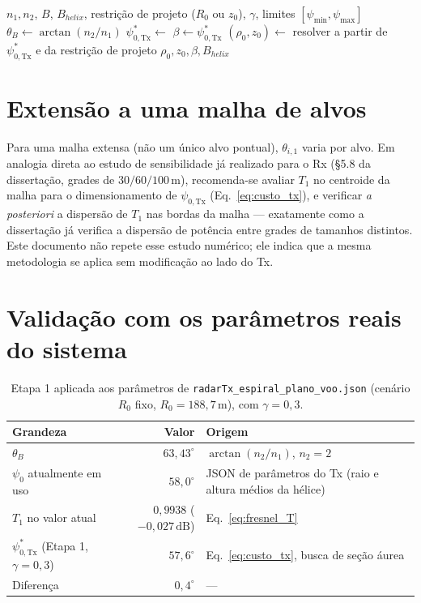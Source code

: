 \documentclass[12pt,a4paper,oneside]{book}
\theoremstyle{definition}
\theoremstyle{remark}
\newcommand{\thetaB}{\theta_B}
\newcommand{\psiT}{\psi_{0,\mathrm{Tx}}}
\begin{document}
\begin{algorithm}[H]
\caption{Otimização do Tx (Etapa 1)}
\begin{algorithmic}[1]
\Require $n_1,n_2$, $B$, $B_{helix}$, restrição de projeto ($R_0$ ou $z_0$),
  $\gamma$, limites $[\psi_{\min},\psi_{\max}]$
\State $\thetaB \gets \arctan(n_2/n_1)$
\State $\psiT^* \gets$ 
\State $\beta \gets \psiT^*$ 
\State $(\rho_0,z_0) \gets$ resolver a partir de $\psiT^*$ e da restrição de projeto
\State \Return $\rho_0,z_0,\beta,B_{helix}$ 
\end{algorithmic}
\end{algorithm}

\section{Extensão a uma malha de alvos}

Para uma malha extensa (não um único alvo pontual), $\theta_{i,1}$ varia
por alvo. Em analogia direta ao estudo de sensibilidade já realizado para
o Rx (§5.8 da dissertação, grades de $30/60/100\,\mathrm{m}$), recomenda-se
avaliar $T_1$ no centroide da malha para o dimensionamento de $\psiT$
(Eq.~\eqref{eq:custo_tx}), e verificar \emph{a posteriori} a dispersão de
$T_1$ nas bordas da malha — exatamente como a dissertação já verifica a
dispersão de potência entre grades de tamanhos distintos. Este documento
não repete esse estudo numérico; ele indica que a mesma metodologia se
aplica sem modificação ao lado do Tx.

\section{Validação com os parâmetros reais do sistema}
\label{sec:validacao}

\begin{table}[H]
\centering
\caption{Etapa 1 aplicada aos parâmetros de
\texttt{radarTx\_espiral\_plano\_voo.json} (cenário $R_0$ fixo,
$R_0=188{,}7\,\mathrm{m}$), com $\gamma=0{,}3$.}
\label{tab:validacao_etapa1}
\begin{tabularx}{\textwidth}{@{}l r X@{}}
\toprule
Grandeza & Valor & Origem \\
\midrule
$\thetaB$ & $63{,}43^\circ$ & $\arctan(n_2/n_1)$, $n_2=2$ \\
$\psi_0$ atualmente em uso & $58{,}0^\circ$ & JSON de parâmetros do Tx (raio e altura médios da hélice) \\
$T_1$ no valor atual & $0{,}9938$ ($-0{,}027\,\mathrm{dB}$) & Eq.~\eqref{eq:fresnel_T} \\
$\psiT^*$ (Etapa 1, $\gamma=0{,}3$) & $57{,}6^\circ$ & Eq.~\eqref{eq:custo_tx}, busca de seção áurea \\
Diferença & $0{,}4^\circ$ & --- \\
\bottomrule
\end{tabularx}
\end{table}
\end{document}
